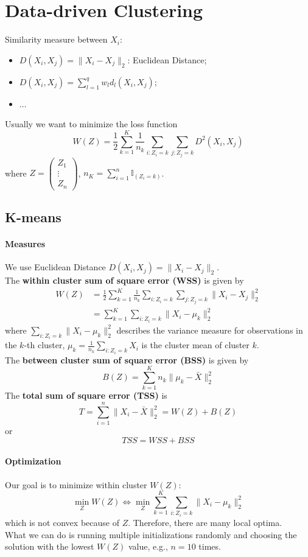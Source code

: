 \documentclass[12pt]{book}
\theoremstyle{definition}
\theoremstyle{remark}
\begin{document}
\newpage
\section{Data-driven Clustering}
Similarity measure between $X_i$:
\begin{itemize}
    \item $D(X_i,X_j) = \|X_i - X_j\|_2$: Euclidean Distance;
    \item $D(X_i,X_j) = \sum_{l=1}^qw_ld_l(X_i,X_j)$;
    \item $\dots$
\end{itemize}

Usually we want to minimize the loss function \[W(Z) = \frac12\sum_{k=1}^K\frac1{n_k} \sum_{i:Z_i = k}\sum_{j:Z_j=k}D^2(X_i,X_j)\]
where $Z = \begin{pmatrix}
    Z_1\\\vdots\\Z_n
\end{pmatrix}$, $n_K = \sum_{i=1}^n \mathbb{I}_{(Z_i = k)}$.


\subsection{K-means}
\paragraph{Measures}
We use Euclidean Distance $D(X_i,X_j) = \|X_i - X_j\|_2$. \\
The \textbf{within cluster sum of square error (WSS)} is given by
\begin{align*}
    W(Z) &= \frac12 \sum_{k=1}^K \frac1{n_k}\sum_{i:Z_i = k}\sum_{j:Z_j=k}\|X_i - X_j\|_2^2\\
    &= \sum_{k=1}^K \sum_{i:Z_i = k} \|X_i - \mu_k\|_2^2
\end{align*}
where $\sum_{i:Z_i = k} \|X_i - \mu_k\|_2^2$ describes the variance measure for observations in the $k$-th cluster, $\mu_k = \frac1{n_k} \sum_{i:Z_i = k}X_i$ is the cluster mean of cluster $k$.\\
The \textbf{between cluster sum of square error (BSS)} is given by
\[B(Z) = \sum_{k=1}^K n_k\|\mu_k - \bar{X}\|_2^2\]
The \textbf{total sum of square error (TSS)} is
\[T = \sum_{i=1}^n \|X_i-\bar{X}\|_2^2 = W(Z) + B(Z)\] or \[TSS = WSS + BSS\]

\paragraph{Optimization}
Our goal is to minimize within cluster $W(Z)$: 
\[\min_{Z} W(Z) \Leftrightarrow\min_{Z}\sum_{k=1}^K\sum_{i:Z_i = k}\|X_i - \mu_k\|_2^2\]
which is not convex because of $Z$. Therefore, there are many local optima.\\
What we can do is running multiple initializations randomly and choosing the solution with the lowest $W(Z)$ value, e.g., $n = 10$ times.
\end{document}
